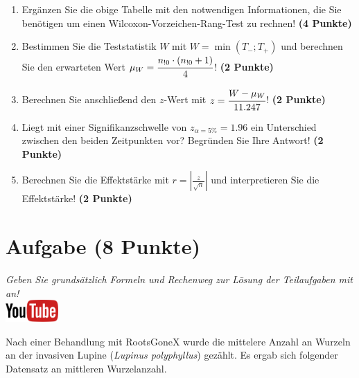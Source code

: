 \documentclass[a4paper, 9pt]{scrartcl}\usepackage[]{graphicx}\usepackage[]{xcolor}
\begin{document}
\begin{enumerate}
\item Erg{\"a}nzen Sie die obige Tabelle mit den notwendigen Informationen, die
  Sie ben{\"o}tigen um einen Wilcoxon-Vorzeichen-Rang-Test zu rechnen!
  \textbf{(4 Punkte)}
\item Bestimmen Sie die Teststatistik $W$ mit $W = \min(T_{-}; T_{+})$ und
  berechnen Sie den erwarteten Wert $\mu_W = \cfrac{n_{!0} \cdot (n_{!0} + 1)}{4}$!
  \textbf{(2 Punkte)}
\item Berechnen Sie anschlie{\ss}end den $z$-Wert mit $z = \cfrac{W -
    \mu_W}{11.247}$! \textbf{(2 Punkte)}
\item Liegt mit einer Signifikanzschwelle von $z_{\alpha = 5\%} =
  1.96$ ein Unterschied zwischen den beiden Zeitpunkten vor? Begr{\"u}nden Sie
  Ihre Antwort! \textbf{(2 Punkte)} 
\item Berechnen Sie die Effektst{\"a}rke mit $r = |\frac{z}{\sqrt{n}}| $ und
  interpretieren Sie die Effektst{\"a}rke! \textbf{(2 Punkte)} 
\end{enumerate} 
\clearpage

\section{Aufgabe \hfill (8 Punkte)}

\textit{Geben Sie grunds{\"a}tzlich Formeln und Rechenweg zur L{\"o}sung der
  Teilaufgaben mit an!} \\[1Ex]

\hfill\href{https://youtu.be/5tiJFxuZcco}{\includegraphics[width =
  2cm]{img/youtube}} %
\hspace{2Ex}




Nach einer Behandlung mit RootsGoneX wurde die mittelere Anzahl an Wurzeln
an der invasiven Lupine (\textit{Lupinus polyphyllus}) gez{\"a}hlt. Es ergab sich
folgender Datensatz an mittleren Wurzelanzahl.
\end{document}

